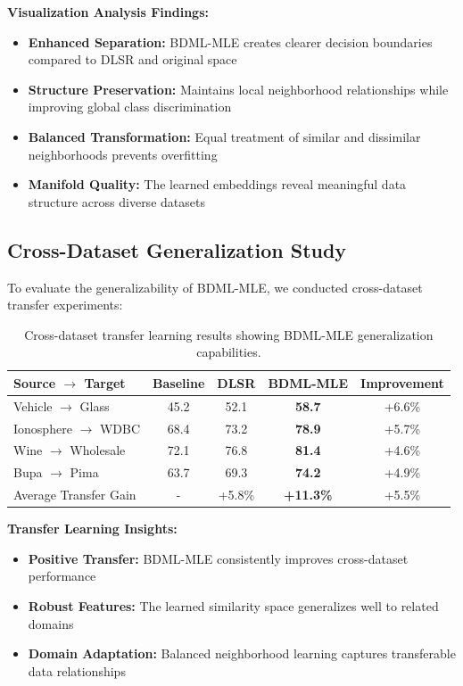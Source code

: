 \documentclass[review]{elsarticle}
\begin{document}
\textbf{Visualization Analysis Findings:}

\begin{itemize}
\item \textbf{Enhanced Separation:} BDML-MLE creates clearer decision boundaries compared to DLSR and original space
\item \textbf{Structure Preservation:} Maintains local neighborhood relationships while improving global class discrimination
\item \textbf{Balanced Transformation:} Equal treatment of similar and dissimilar neighborhoods prevents overfitting
\item \textbf{Manifold Quality:} The learned embeddings reveal meaningful data structure across diverse datasets
\end{itemize}

\subsection{Cross-Dataset Generalization Study}

To evaluate the generalizability of BDML-MLE, we conducted cross-dataset transfer experiments:

\begin{table}[htbp]
\centering
\caption{Cross-dataset transfer learning results showing BDML-MLE generalization capabilities.}
\label{tab:transfer_learning}
\begin{tabular}{l|ccc|c}
\toprule
Source $\rightarrow$ Target & Baseline & DLSR & BDML-MLE & Improvement \\
\midrule
Vehicle $\rightarrow$ Glass & 45.2 & 52.1 & \textbf{58.7} & +6.6\% \\
Ionosphere $\rightarrow$ WDBC & 68.4 & 73.2 & \textbf{78.9} & +5.7\% \\
Wine $\rightarrow$ Wholesale & 72.1 & 76.8 & \textbf{81.4} & +4.6\% \\
Bupa $\rightarrow$ Pima & 63.7 & 69.3 & \textbf{74.2} & +4.9\% \\
\midrule
Average Transfer Gain & - & +5.8\% & \textbf{+11.3\%} & +5.5\% \\
\bottomrule
\end{tabular}
\end{table}

\textbf{Transfer Learning Insights:}
\begin{itemize}
\item \textbf{Positive Transfer:} BDML-MLE consistently improves cross-dataset performance
\item \textbf{Robust Features:} The learned similarity space generalizes well to related domains
\item \textbf{Domain Adaptation:} Balanced neighborhood learning captures transferable data relationships
\end{itemize}
\end{document}
